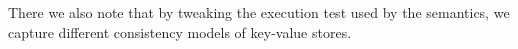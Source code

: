 %
%


\ac{
There we also note that by tweaking the execution test used by the 
semantics, we capture different consistency models of 
key-value stores.
}


